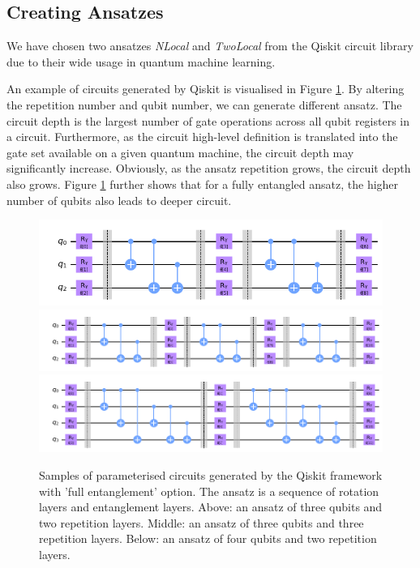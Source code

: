 \subsection{Creating Ansatzes}
We have chosen two ansatzes \textit{NLocal} and \textit{TwoLocal} from the Qiskit circuit library due to their wide usage in quantum machine learning.

An example of circuits generated by Qiskit is visualised in Figure \ref{Ansatz samples}.
By altering the repetition number and qubit number, we can generate different ansatz.
The circuit depth is the largest number of gate operations across all qubit registers in a circuit.
Furthermore, as the circuit high-level definition is translated into the gate set available on a given quantum machine, the circuit depth may significantly increase.
Obviously, as the ansatz repetition grows, the circuit depth also grows.
Figure \ref{Ansatz samples} further shows that for a fully entangled ansatz, the higher number of qubits also leads to deeper circuit.

\begin{figure}
    \includegraphics[width=\textwidth]{Artefact/Appendices/ansatz3-2.png}
    \includegraphics[width=\textwidth]{Artefact/Appendices/ansatz3-3.png}
    \includegraphics[width=\textwidth]{Artefact/Appendices/ansatz4-2.png}
    \caption{
        Samples of parameterised circuits generated by the Qiskit framework with 'full entanglement' option.
        The ansatz is a sequence of rotation layers and entanglement layers.
        Above: an ansatz of three qubits and two repetition layers.
        Middle: an ansatz of three qubits and three repetition layers.
        Below: an ansatz of four qubits and two repetition layers.
    }
    \label{Ansatz samples}
\end{figure}